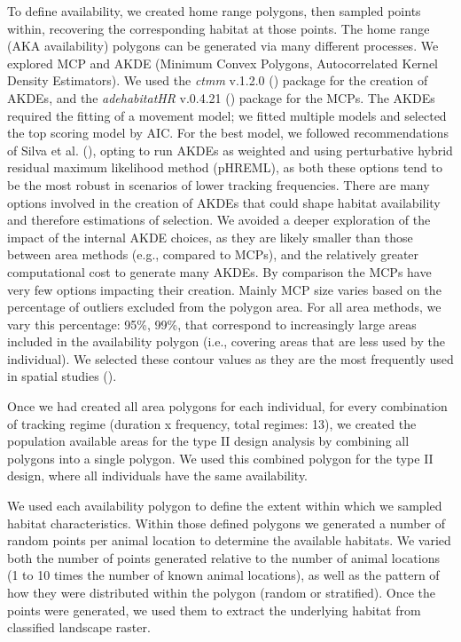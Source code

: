\documentclass[10pt,a4paper]{article}
\begin{document}
To define availability, we created home range polygons, then sampled points within, recovering the corresponding habitat at those points.
The home range (AKA availability) polygons can be generated via many different processes.
We explored MCP and AKDE (Minimum Convex Polygons, Autocorrelated Kernel Density Estimators).
We used the \emph{ctmm} v.1.2.0 () package for the creation of AKDEs, and the \emph{adehabitatHR} v.0.4.21 () package for the MCPs.
The AKDEs required the fitting of a movement model; we fitted multiple models and selected the top scoring model by AIC.
For the best model, we followed recommendations of Silva et al. (), opting to run AKDEs as weighted and using perturbative hybrid residual maximum likelihood method (pHREML), as both these options tend to be the most robust in scenarios of lower tracking frequencies.
There are many options involved in the creation of AKDEs that could shape habitat availability and therefore estimations of selection.
We avoided a deeper exploration of the impact of the internal AKDE choices, as they are likely smaller than those between area methods (e.g., compared to MCPs), and the relatively greater computational cost to generate many AKDEs.
By comparison the MCPs have very few options impacting their creation.
Mainly MCP size varies based on the percentage of outliers excluded from the polygon area.
For all area methods, we vary this percentage: 95\%, 99\%, that correspond to increasingly large areas included in the availability polygon (i.e., covering areas that are less used by the individual).
We selected these contour values as they are the most frequently used in spatial studies ().

Once we had created all area polygons for each individual, for every combination of tracking regime (duration x frequency, total regimes: 13), we created the population available areas for the type II design analysis by combining all polygons into a single polygon.
We used this combined polygon for the type II design, where all individuals have the same availability.

We used each availability polygon to define the extent within which we sampled habitat characteristics.
Within those defined polygons we generated a number of random points per animal location to determine the available habitats.
We varied both the number of points generated relative to the number of animal locations (1 to 10 times the number of known animal locations), as well as the pattern of how they were distributed within the polygon (random or stratified).
Once the points were generated, we used them to extract the underlying habitat from classified landscape raster.
\end{document}
